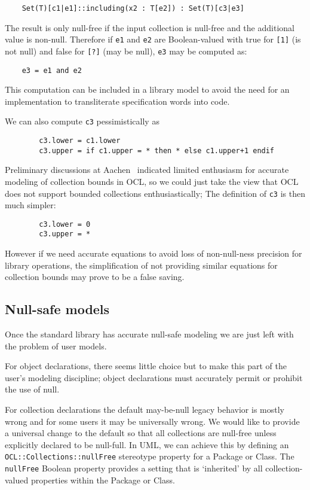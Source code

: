 \documentclass{llncs}
\begin{document}
\begin{verbatim}
    Set(T)[c1|e1]::including(x2 : T[e2]) : Set(T)[c3|e3]
\end{verbatim}

The result is only null-free if the input collection is null-free and the additional value is non-null. Therefore if \verb$e1$ and \verb$e2$ are Boolean-valued with true for \verb$[1]$ (is not null) and false for \verb$[?]$ (may be null), \verb$e3$ may be computed as:
\begin{verbatim}
    e3 = e1 and e2
\end{verbatim}

This computation can be included in a library model  to avoid the need for an implementation to transliterate specification words into code.

We can also compute \verb$c3$ pessimistically as

\begin{verbatim}
        c3.lower = c1.lower
        c3.upper = if c1.upper = * then * else c1.upper+1 endif
\end{verbatim}

Preliminary discussions at Aachen~\cite{aachen} indicated limited enthusiasm for accurate modeling of collection bounds in OCL, so we could just take the view that OCL does not support bounded collections enthusiastically; The definition of \verb$c3$ is then much simpler:

\begin{verbatim}
        c3.lower = 0
        c3.upper = *
\end{verbatim}

However if we need accurate equations to avoid loss of non-null-ness precision for library operations, the simplification of not providing similar equations for collection bounds may prove to be a false saving.

\subsection{Null-safe models}    
      
Once the standard library has accurate null-safe modeling we are just left with the problem of user models.

For object declarations, there seems little choice but to make this part of the user's modeling discipline; object declarations must accurately permit or prohibit the use of null.

For collection declarations the default may-be-null legacy behavior is mostly wrong and for some users it may be universally wrong. We would like to provide a universal change to the default so that all collections are null-free unless explicitly declared to be null-full. In UML, we can achieve this by defining an \verb$OCL::Collections::nullFree$ stereotype property for a Package or Class. The \verb$nullFree$ Boolean property provides a setting that is `inherited' by all collection-valued properties within the Package or Class.
\end{document}
